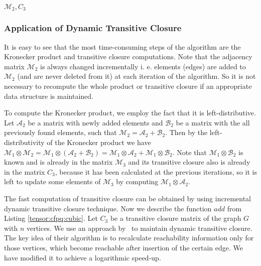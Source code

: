 \begin{algorithm}[h]
\begin{algorithmic}[1]
    \EndWhile
\State \Return $\mathcal{M}_2, C_3$
\EndFunction
{}
    \State {}
\EndFunction
{}
    \State {}
\EndFunction
\end{algorithmic}
\end{algorithm}
\subsubsection{Application of Dynamic Transitive Closure}
It is easy to see that the most time-consuming steps of the algorithm are the Kronecker product and transitive closure computations.
Note that the adjacency matrix $\mathcal{M}_2$ is always changed incrementally i. e. elements (edges) are added to $\mathcal{M}_2$ (and are never deleted from it) at each iteration of the algorithm.
So it is not necessary to recompute the whole product or transitive closure if an appropriate data structure is maintained.

To compute the Kronecker product, we employ the fact that it is left-distributive.
Let $\mathcal{A}_2$ be a matrix with newly added elements and $\mathcal{B}_2$ be a matrix with the all previously found elements, such that $\mathcal{M}_2 = \mathcal{A}_2 + \mathcal{B}_2$.
Then by the left-distributivity of the Kronecker product we have $\mathcal{M}_1 \otimes \mathcal{M}_2 = \mathcal{M}_1 \otimes (\mathcal{A}_2 + \mathcal{B}_2) = \mathcal{M}_1\otimes \mathcal{A}_2 + \mathcal{M}_1 \otimes \mathcal{B}_2$.
Note that $\mathcal{M}_1 \otimes \mathcal{B}_2$ is known and is already in the matrix $\mathcal{M}_3$ and its transitive closure also is already in the matrix $C_3$, because it has been calculated at the previous iterations, so it is left to update some elements of $\mathcal{M}_3$ by computing $\mathcal{M}_1\otimes \mathcal{A}_2$.


The fast computation of transitive closure can be obtained by using incremental dynamic transitive closure technique. Now we describe the function $add$ from Listing \ref{tensor:cfpq:cubic}. Let $C_3$ be a transitive closure matrix of the graph $G$ with $n$ vertices. We use an approach by~\cite{IBARAKI198395} to maintain dynamic transitive closure. The key idea of their algorithm is to recalculate reachability information only for those vertices, which become reachable after insertion of the certain edge. We have modified it to achieve a logarithmic speed-up.


